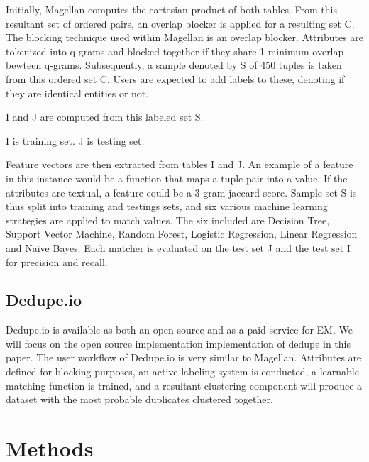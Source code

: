 \documentclass[letterpaper,twocolumn,10pt]{article}
\begin{document}
Initially, Magellan computes the cartesian product of both tables. From this resultant set of ordered pairs, an overlap blocker is applied for a resulting set C. The blocking technique used within Magellan is an overlap blocker. Attributes are tokenized into q-grams and blocked together if they share 1 minimum overlap bewteen q-grams. Subsequently, a sample denoted by S of 450 tuples is taken from this ordered set C. Users are expected to add labels to these, denoting if they are identical entities or not. 

I and J are computed from this labeled set S.

I is training set. J is testing set.

Feature vectors are then extracted from tables I and J. An example of a feature in this instance would be a function that maps a tuple pair into a value. If the attributes are textual, a feature could be a 3-gram jaccard score. Sample set S is thus split into training and testings sets, and six various machine learning strategies are applied to match values. The six included are Decision Tree, Support Vector Machine, Random Forest, Logistic Regression, Linear Regression and Naive Bayes. Each matcher is evaluated on the test set J and the test set I for precision and recall. 






\subsection{Dedupe.io}
Dedupe.io is available as both an open source and as a paid service for EM. We will focus on the open source implementation implementation of dedupe in this paper. The user workflow of Dedupe.io is very similar to Magellan. Attributes are defined for blocking purposes, an active labeling system is conducted, a learnable matching function is trained, and a resultant clustering component will produce a dataset with the most probable duplicates clustered together. 





\section{Methods}
\end{document}
